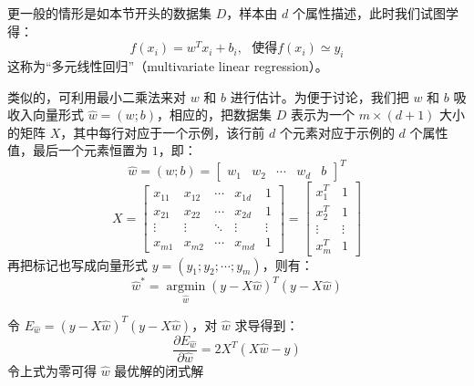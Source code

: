 \documentclass[12pt, a4paper]{article} %
\begin{document}
更一般的情形是如本节开头的数据集 $D$，样本由 $d$ 个属性描述，此时我们试图学得：
\begin{equation*}
    f(x_i) = w^T x_i + b_i, \ \ \ \text{使得} f(x_i) \simeq y_i
\end{equation*}
这称为“多元线性回归”（multivariate linear regression）。

类似的，可利用最小二乘法来对 $w$ 和 $b$ 进行估计。为便于讨论，我们把 $w$ 和 $b$ 吸收入向量形式 $\hat{w} = (w; b)$，相应的，把数据集 $D$ 表示为一个 $m \times (d + 1)$ 大小的矩阵 $X$，其中每行对应于一个示例，该行前 $d$ 个元素对应于示例的 $d$ 个属性值，最后一个元素恒置为 $1$，即：
\begin{equation*}
    \hat w = (w;b) = {\left[ {\begin{array}{*{20}{c}}
        {{w_1}}&{{w_2}}& \cdots &{{w_d}}&b
    \end{array}} \right]^T}
\end{equation*}
\begin{equation*}
    X = \left[ {\begin{array}{*{20}{c}}
        {{x_{11}}}&{{x_{12}}}& \cdots &{{x_{1d}}}&1\\
        {{x_{21}}}&{{x_{22}}}& \cdots &{{x_{2d}}}&1\\
         \vdots & \vdots & \ddots & \vdots & \vdots \\
        {{x_{m1}}}&{{x_{m2}}}& \cdots &{{x_{md}}}&1
        \end{array}} \right] = \left[ {\begin{array}{*{20}{c}}
        {x_1^T}&1\\
        {x_2^T}&1\\
         \vdots & \vdots \\
        {x_m^T}&1
    \end{array}} \right]
\end{equation*}
再把标记也写成向量形式 $y = (y_1; y_2; \cdots; y_m)$，则有：
\begin{equation*}
    \hat{w}^* = \mathop {\arg \min }\limits_{\hat w} {\left( {y - X\hat w} \right)^T}\left( {y - X\hat w} \right)
\end{equation*}

令 $E_{\hat{w}} = {\left( {y - X\hat w} \right)^T}\left( {y - X\hat w} \right)$，对 $\hat{w}$ 求导得到：
\begin{equation*}
    \frac{{\partial {E_{\hat w}}}}{{\partial \hat w}} = 2{X^T}(X\hat w - y)
\end{equation*}
令上式为零可得 $\hat{w}$ 最优解的闭式解
\end{document}
